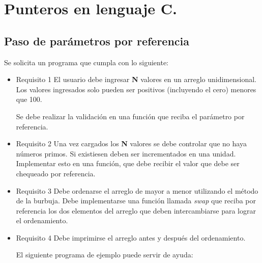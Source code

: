 \section{Punteros en lenguaje C.}
\setcounter{subsection}{8}

\subsection*{Paso de parámetros por referencia}
Se solicita un programa que cumpla con lo siguiente:
\begin{itemize}[a)]
  \item Requisito 1
    El usuario debe ingresar \textbf{N} valores en un arreglo unidimensional. Los valores ingresados solo pueden ser positivos (incluyendo el cero) menores que 100.

    Se debe realizar la validación en una función que reciba el parámetro por referencia.

  \item Requisito 2
    Una vez cargados los \textbf{N} valores se debe controlar que no haya números primos. Si existiesen deben ser incrementados en una unidad. Implementar esto en una función,
    que debe recibir el valor que debe ser chequeado por referencia.

  \item Requisito 3
    Debe ordenarse el arreglo de mayor a menor utilizando el método de la burbuja. Debe implementarse una función llamada \textit{swap}
    que reciba por referencia los dos elementos del arreglo que deben intercambiarse para lograr el ordenamiento.

  \item Requisito 4
    Debe imprimirse el arreglo antes y después del ordenamiento.


    \hspace{-5mm}El siguiente programa de ejemplo puede servir de ayuda:

    \lstset{inputencoding=utf8/latin1}
    
\end{itemize}
